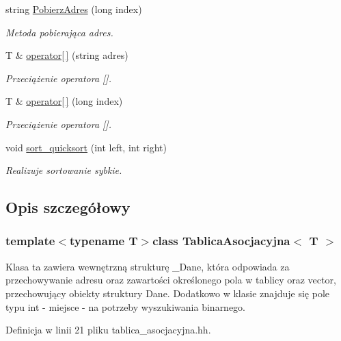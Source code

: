 \begin{DoxyCompactItemize}
string \hyperlink{class_tablica_asocjacyjna_a9aeec8d0066efa5efce02ef4317d3011}{\-Pobierz\-Adres} (long index)
\begin{DoxyCompactList}\small\item\em \-Metoda pobierająca adres. \end{DoxyCompactList}\item 
\-T \& \hyperlink{class_tablica_asocjacyjna_a6d053fdbf4d8bbabbb2f487de8cf261d}{operator\mbox{[}$\,$\mbox{]}} (string adres)
\begin{DoxyCompactList}\small\item\em \-Przeciążenie operatora \mbox{[}\mbox{]}. \end{DoxyCompactList}\item 
\-T \& \hyperlink{class_tablica_asocjacyjna_a21688064e4bc890b91f24dbebdab6b9d}{operator\mbox{[}$\,$\mbox{]}} (long index)
\begin{DoxyCompactList}\small\item\em \-Przeciążenie operatora \mbox{[}\mbox{]}. \end{DoxyCompactList}\item 
void \hyperlink{class_tablica_asocjacyjna_af08bb1f3933f46688a62f3ad77a08bbd}{sort\-\_\-quicksort} (int left, int right)
\begin{DoxyCompactList}\small\item\em \-Realizuje sortowanie sybkie. \end{DoxyCompactList}\end{DoxyCompactItemize}


\subsection{\-Opis szczegółowy}
\subsubsection*{template$<$typename \-T$>$class Tablica\-Asocjacyjna$<$ T $>$}

\-Klasa ta zawiera wewnętrzną strukturę \-\_\-\-Dane, która odpowiada za przechowywanie adresu oraz zawartości określonego pola w tablicy oraz vector, przechowujący obiekty struktury \-Dane. \-Dodatkowo w klasie znajduje się pole typu int -\/ miejsce -\/ na potrzeby wyszukiwania binarnego. 

\-Definicja w linii 21 pliku tablica\-\_\-asocjacyjna.\-hh.



